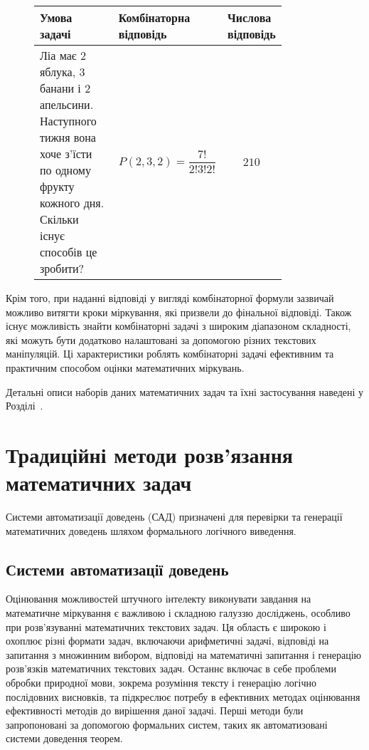 \begin{figure} \centering \small
    \label{table:puzzle_example}
    \begin{tabular}{|p{0.38\linewidth}|p{0.31\linewidth}|p{0.13\linewidth}|}
        \hline
        \textbf{Умова задачі} & \textbf{Комбінаторна відповідь} & \textbf{Числова відповідь} \\
        \hline
        Ліа має 2 яблука, 3 банани і 2 апельсини. Наступного тижня вона хоче з'їсти по одному фрукту кожного дня. Скільки існує способів це зробити? & \[ P(2,3,2) = \frac{7!}{2!3!2!} \] & \[ 210 \] \\
        \hline
    \end{tabular}

\end{figure}

Крім того, при наданні відповіді у вигляді комбінаторної формули зазвичай можливо витягти кроки міркування, які призвели до фінальної відповіді. Також існує можливість знайти комбінаторні задачі з широким діапазоном складності, які можуть бути додатково налаштовані за допомогою різних текстових маніпуляцій. Ці характеристики роблять комбінаторні задачі ефективним та практичним способом оцінки математичних міркувань.

Детальні описи наборів даних математичних задач та їхні застосування наведені у Розділі~.

\section{Традиційні методи розв'язання математичних задач}

Системи автоматизації доведень (САД) призначені для перевірки та генерації математичних доведень шляхом формального логічного виведення. 

\subsection{Системи автоматизації доведень}

Оцінювання можливостей штучного інтелекту виконувати завдання на математичне міркування є важливою і складною галуззю досліджень, особливо при розв'язуванні математичних текстових задач. Ця область є широкою і охоплює різні формати задач, включаючи арифметичні задачі, відповіді на запитання з множинним вибором, відповіді на математичні запитання і генерацію розв'язків математичних текстових задач. Останнє включає в себе проблеми обробки природної мови, зокрема розуміння тексту і генерацію логічно послідовних висновків, та підкреслює потребу в ефективних методах оцінювання ефективності методів до вирішення даної задачі. Перші методи були запропоновані за допомогою формальних систем, таких як автоматизовані системи доведення теорем.


